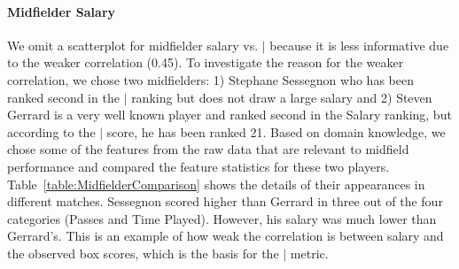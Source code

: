 		
		\paragraph{Midfielder Salary} 
		
		We omit a scatterplot for midfielder salary vs. $\mid$ because it is less informative due to the weaker  correlation (0.45).
		To investigate the reason for the weaker correlation, we chose two midfielders: 1) Stephane Sessegnon  who has been ranked second in the $\mid$ ranking but does not draw a large salary and 2) Steven Gerrard is a very well known player and ranked second in the Salary ranking, but according to the $\mid$ score, he has been ranked 21. Based on domain knowledge, we chose some of the features from the raw data that are relevant to midfield performance and compared the feature statistics for these two players. Table~\ref{table:MidfielderComparison} shows the details of their appearances in different matches. Sessegnon scored higher than Gerrard in three out of the four categories (Passes and Time Played). However, his salary was much lower than Gerrard's. This is an example of how weak the correlation is between salary and the observed box scores, which is the basis for the $\mid$ metric. 

